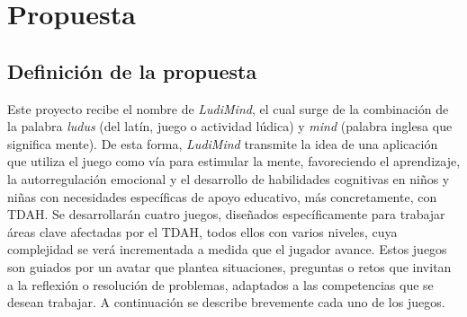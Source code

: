 \section{Propuesta}

\subsection{Definición de la propuesta}
Este proyecto recibe el nombre de \textit{LudiMind}, el cual surge de la combinación de la palabra \textit{ludus} (del latín, juego o actividad lúdica) y \textit{mind} (palabra inglesa que significa mente).
De esta forma, \textit{LudiMind} transmite la idea de una aplicación que utiliza el juego como vía para estimular la mente, favoreciendo el aprendizaje, la autorregulación emocional y el desarrollo de habilidades cognitivas en niños y niñas con necesidades específicas de apoyo educativo, más concretamente, con TDAH.
Se desarrollarán cuatro juegos, diseñados específicamente para trabajar áreas clave afectadas por el TDAH, todos ellos con varios niveles, cuya complejidad se verá incrementada a medida que el jugador avance.
Estos juegos son guiados por un avatar que plantea situaciones, preguntas o retos que invitan a la reflexión o resolución de problemas, adaptados a las competencias que se desean trabajar.
A continuación se describe brevemente cada uno de los juegos.

